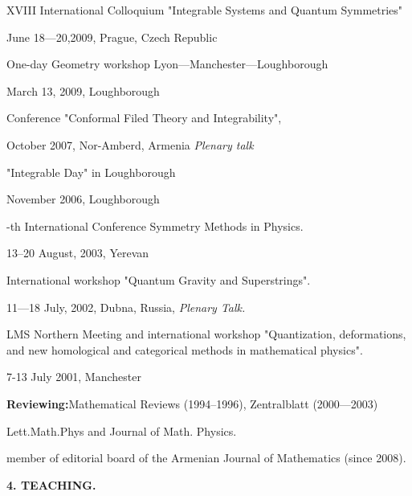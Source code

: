 \documentclass[12pt]{article}
\newcommand{\punkt}{\par\medskip\noindent}
\newcommand{\razdel}{\par\bigskip\noindent}
\def\m {\medskip}
\begin{document}
\noindent  XVIII International Colloquium
"Integrable Systems and Quantum Symmetries"

  June 18---20,2009, Prague, Czech Republic 


\m

\noindent One-day Geometry workshop Lyon---Manchester---Loughborough
 

            March 13,  2009, Loughborough 



\m


\noindent Conference "Conformal Filed Theory and Integrability",

       October 2007, Nor-Amberd, Armenia {\it Plenary talk}

\m

\noindent "Integrable Day" in Loughborough

        November 2006, Loughborough  



\m


-th International Conference Symmetry Methods in
Physics.
   
        13--20 August, 2003, Yerevan 

\m

\noindent  International workshop "Quantum Gravity and Superstrings".
 
       11---18 July, 2002, Dubna, Russia,  {\it Plenary Talk.}

\m

\noindent   LMS Northern Meeting and international workshop "Quantization, deformations,
and new homological and categorical methods in mathematical
physics". 

       
   7-13 July 2001, Manchester 
 
   \punkt
 {\bf Reviewing:}\smallskip Mathematical Reviews (1994--1996), Zentralblatt (2000---2003)

  \smallskip Lett.Math.Phys and Journal of Math. Physics.

   member of editorial board 
 of the Armenian Journal of Mathematics
  (since 2008).






   \begin{center}
   \large \bf 4. TEACHING.
   \end{center}
\end{document}
